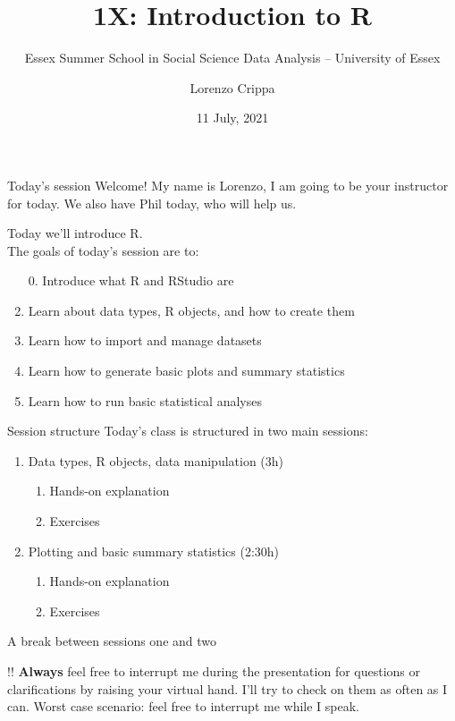 \documentclass[xcolor=table,dvipsnames]{beamer}
\title{1X: Introduction to R}
\subtitle{Essex Summer School in Social Science Data Analysis -- University of Essex}
\date{11 July, 2021}
\author{Lorenzo Crippa}
\institute{University of Essex -- Department of Government}
\begin{document}
\begin{frame}[plain]
\begin{center}
\titlepage
\end{center}
\end{frame}

\begin{frame}{Today's session}
Welcome! My name is Lorenzo, I am going to be your instructor for today. We also have Phil today, who will help us.

Today we'll introduce R. \\ \pause
The goals of today's session are to: \pause
\begin{enumerate}
\item[0.] Introduce what R and RStudio are \pause
\item Learn about data types, R objects, and how to create them \pause
\item Learn how to import and manage datasets \pause
\item Learn how to generate basic plots and summary statistics \pause
\item Learn how to run basic statistical analyses
\end{enumerate}
\end{frame}

\begin{frame}{Session structure}
Today's class is structured in two main sessions: \pause
\begin{enumerate}
\item Data types, R objects, data manipulation (3h) \pause
	\begin{enumerate}
	\item Hands-on explanation
	\item Exercises
	\end{enumerate} \pause
\item Plotting and basic summary statistics (2:30h) \pause
	\begin{enumerate}
	\item Hands-on explanation
	\item Exercises
	\end{enumerate}
\end{enumerate} \pause

A break between sessions one and two \pause

!! \textbf{Always} feel free to interrupt me during the presentation for questions or clarifications by raising your virtual hand. I'll try to check on them as often as I can. \pause Worst case scenario: feel free to interrupt me while I speak.
\end{frame}
\end{document}
